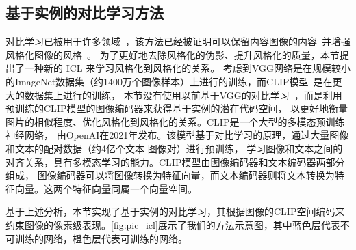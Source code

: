 \subsection{基于实例的对比学习方法}
对比学习已被用于许多领域~\cite{chen2020improved,han2021dual,wu2021contrastive}，该方法已经被证明可以保留内容图像的内容~\cite{han2021dual}并增强风格化图像的风格~\cite{chen2021artistic}。
为了更好地去除风格化的伪影、提升风格化的质量，本节提出了一种新的 ICL 来学习风格化到风格化的关系。
考虑到VGG网络是在规模较小的ImageNet数据集（约1400万个图像样本）上进行的训练，而CLIP模型~\cite{radford2021learning}是在更大的数据集上进行的训练，
本节没有使用以前基于VGG的对比学习~\cite{han2021dual}，而是利用预训练的CLIP模型的图像编码器来获得基于实例的潜在代码空间，
以更好地衡量图片的相似程度、优化风格化到风格化的关系。CLIP是一个大型的多模态预训练神经网络，
由OpenAI在2021年发布。‌该模型基于对比学习的原理，通过大量图像和文本的配对数据（约4亿个文本-图像对）进行预训练，
学习图像和文本之间的对齐关系，具有多模态学习的能力。CLIP模型由图像编码器和文本编码器两部分组成，
图像编码器可以将图像转换为特征向量，而文本编码器则将文本转换为特征向量。这两个特征向量同属一个向量空间。

\par 基于上述分析，本节实现了基于实例的对比学习，其根据图像的CLIP空间编码来约束图像的像素级表现。\autoref{fig:pic_icl}展示了我们的方法示意图，其中蓝色层代表不可训练的网络，橙色层代表可训练的网络。

